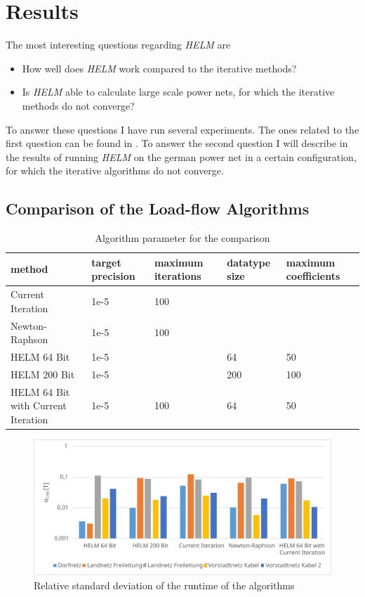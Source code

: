 \chapter{Results}
\label{sec:results}
The most interesting questions regarding \emph{HELM} are
\begin{itemize}
	\item How well does \emph{HELM} work compared to the iterative methods?
	\item Is \emph{HELM} able to calculate large scale power nets, for which the iterative methods do not converge?
\end{itemize}
To answer these questions I have run several experiments. The ones related to the first question can be found in . To answer the second question I will describe in  the results of running \emph{HELM} on the german power net in a certain configuration, for which the iterative algorithms do not converge.

\section{Comparison of the Load-flow Algorithms}
\label{sec:comparison_algorithms}

\begin{table}
	\small
	\begin{tabularx}{\textwidth}{|X|p{1.5cm}|p{1.6cm}|p{1.5cm}|p{1.9cm}|}
		\hline
		method & target precision & maximum iterations & datatype size & maximum coefficients \\ \hline
		Current Iteration & 1e-5 & 100 & & \\ \hline
		Newton-Raphson & 1e-5 & 100 & & \\ \hline
		HELM 64 Bit & 1e-5 & & 64 & 50 \\ \hline
		HELM 200 Bit & 1e-5 & & 200 & 100 \\ \hline
		HELM 64 Bit with Current Iteration & 1e-5 & 100 & 64 & 50 \\ \hline
	\end{tabularx}
	\caption{Algorithm parameter for the comparison}
	\label{tab:comparison_parameter}
\end{table}

\begin{figure}
	\centering
	\includegraphics[scale=0.7]{figures/comparison_deviation}
	\caption[Comparison, relative standard deviation of runtime]{Relative standard deviation of the runtime of the algorithms}
	\label{fig:comparison_deviation}
\end{figure}

